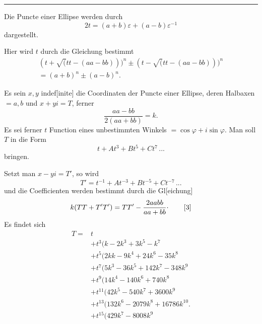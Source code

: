 \begin{minipage}[c]{.25\linewidth}\centering
{}
\end{minipage}
\par\bigskip\noindent\rule{.25\linewidth}{.4pt}\par\smallskip
{\small\par{}\par}
\clearpage{}
\noindent {\small[S. 173]}
\par\indent Die Puncte einer Ellipse werden durch
\[2t=(a+b)\varepsilon+(a-b)\varepsilon^{-1}\]
\noindent dargestellt.
\par\indent Hier wird $t$ durch die Gleichung bestimmt
\[\begin{gathered}
(t+\surd(tt-(aa-bb)))^n\pm(t-\surd(tt-(aa-bb)))^n\\
=(a+b)^n\pm(a-b)^n.
\end{gathered}\]
\noindent {\small[S. 176]}
\par\indent Es sein $x,y$ indef[inite] die Coordinaten der Puncte einer Ellipse, deren Halbaxen $=a,b$ und $x+yi=T$, ferner
\[\frac{aa-bb}{2(aa+bb)}=k.\]
\noindent Es sei ferner $t$ Function eines unbestimmten Winkels $=\cos\varphi+i\sin\varphi$. Man soll $T$ in die Form
\begin{equation}
t+At^3+Bt^5+Ct^7\,{.}{.}{.}\tag*{[1]}
\end{equation}
\noindent bringen.
\par\indent Setzt man $x-yi=T'$, so wird
\begin{equation}
T'=t^{-1}+At^{-3}+Bt^{-5}+Ct^{-7}\,{.}{.}{.}\tag*{[2]}
\end{equation}
\noindent und die Coefficienten werden bestimmt durch die Gl[eichung]
\begin{equation}
k(TT+T'T')=TT'-\frac{2aabb}{aa+bb}\mathpunct{\raisebox{.5ex}{.}}\tag*{[3]}
\end{equation}
\noindent Es findet sich
\clearpage{}
\[\begin{aligned}
T={}&t\\
&+t^3(k-2k^3+3k^5-k^7\\
&+t^5(2kk-9k^4+24k^6-35k^8\\
&+t^7(5k^3-36k^5+142k^7-348k^9\\
&+t^9(14k^4-140k^6+740k^8\\
&+t^{11}(42k^5-540k^7+3600k^9\\
&+t^{13}(132k^6-2079k^8+16786k^{10}.\\
&+t^{15}(429k^7-8008k^9
\end{aligned}\]
